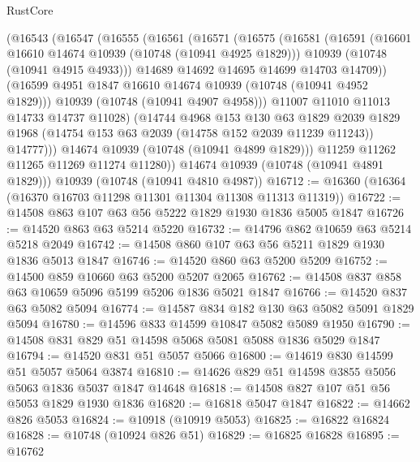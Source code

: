 \begin{lexlean}{RustCore}
\begin{coremodule}
          (@16543
            (@16547
              (@16555
                (@16561
                  (@16571
                    (@16575
                      (@16581
                        (@16591
                          (@16601 @16610 @14674 @10939 (@10748 (@10941 @4925 @1829)))
                          @10939
                          (@10748 (@10941 @4915 @4933)))
                        @14689
                        @14692
                        @14695
                        @14699
                        @14703
                        @14709))
                    (@16599 @4951 @1847 @16610 @14674 @10939 (@10748 (@10941 @4952 @1829)))
                    @10939
                    (@10748 (@10941 @4907 @4958)))
                  @11007
                  @11010
                  @11013
                  @14733
                  @14737
                  @11028)
                (@14744
                  @4968
                  @153
                  @130
                  @63
                  @1829
                  @2039
                  @1829
                  @1968
                  (@14754 @153 @63 @2039 (@14758 @152 @2039 @11239 @11243))
                  @14777)))
            @14674
            @10939
            (@10748 (@10941 @4899 @1829)))
          @11259
          @11262
          @11265
          @11269
          @11274
          @11280))
      @14674
      @10939
      (@10748 (@10941 @4891 @1829)))
    @10939
    (@10748 (@10941 @4810 @4987))
@16712 := @16360 (@16364 (@16370 @16703 @11298 @11301 @11304 @11308 @11313 @11319))
@16722 := @14508 @863 @107 @63 @56 @5222 @1829 @1930 @1836 @5005 @1847
@16726 := @14520 @863 @63 @5214 @5220
@16732 := @14796 @862 @10659 @63 @5214 @5218 @2049
@16742 := @14508 @860 @107 @63 @56 @5211 @1829 @1930 @1836 @5013 @1847
@16746 := @14520 @860 @63 @5200 @5209
@16752 := @14500 @859 @10660 @63 @5200 @5207 @2065
@16762 := @14508 @837 @858 @63 @10659 @5096 @5199 @5206 @1836 @5021 @1847
@16766 := @14520 @837 @63 @5082 @5094
@16774 := @14587 @834 @182 @130 @63 @5082 @5091 @1829 @5094
@16780 := @14596 @833 @14599 @10847 @5082 @5089 @1950
@16790 := @14508 @831 @829 @51 @14598 @5068 @5081 @5088 @1836 @5029 @1847
@16794 := @14520 @831 @51 @5057 @5066
@16800 := @14619 @830 @14599 @51 @5057 @5064 @3874
@16810 := @14626 @829 @51 @14598 @3855 @5056 @5063 @1836 @5037 @1847 @14648
@16818 := @14508 @827 @107 @51 @56 @5053 @1829 @1930 @1836
@16820 := @16818 @5047 @1847
@16822 := @14662 @826 @5053
@16824 := @10918 (@10919 @5053)
@16825 := @16822 @16824
@16828 := @10748 (@10924 @826 @51)
@16829 := @16825 @16828
@16895 := @16762

\end{coremodule}
\end{lexlean}
